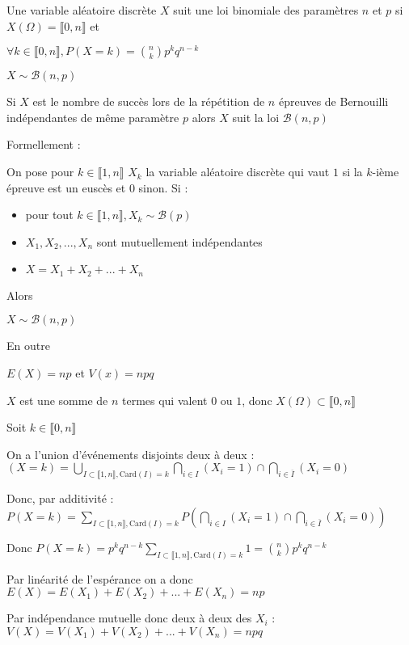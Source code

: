 \documentclass[a4paper,12pt]{book}
\newcommand{\Def}[2]{\begin{tcolorbox}[sharp corners, colback=white,colframe=blue!90!black!75, title=Définition : #1]#2\end{tcolorbox}}
\newcommand{\Prop}[2]{\begin{tcolorbox}[sharp corners, colback=white,colframe=red!90!black!75, title=Proposition : #1]#2\end{tcolorbox}}
\newcommand{\Pre}[1]{\begin{tcolorbox}[sharp corners, colback=white,colframe=green!60!green!30!black!75, title=Preuve]#1\end{tcolorbox}}
\begin{document}
\Def{}{Une variable aléatoire discrète $X$ suit une loi binomiale des paramètres $n$ et $p$ si $X(\Omega)=\llbracket 0,n\rrbracket$ et
\par\begin{center}$\forall k\in \llbracket 0,n\rrbracket, P(X=k)=\binom{n}{k}p^kq^{n-k}$\end{center}
\par $X\sim \mathcal{B}(n,p)$}
\Prop{Modèle loi binomiale}{Si $X$ est le nombre de succès lors de la répétition de $n$ épreuves de Bernouilli indépendantes de même paramètre $p$ alors $X$ suit la loi $\mathcal{B}(n,p)$
\par Formellement :
\par On pose pour $k\in\llbracket 1,n\rrbracket$ $X_k$ la variable aléatoire discrète qui vaut $1$ si la $k$-ième épreuve est un euscès et $0$ sinon. Si :\begin{itemize}
\item pour tout $k\in\llbracket 1,n\rrbracket, X_k\sim\mathcal{B}(p)$
\item $X_1,X_2,..., X_n$ sont mutuellement indépendantes
\item $X=X_1+X_2+...+X_n$
\end{itemize}
Alors \par\begin{center}$X\sim \mathcal{B}(n,p)$\end{center}
\par En outre \par\begin{center}$E(X)=np$ et $V(x)=npq$\end{center}}
\Pre{$X$ est une somme de $n$ termes qui valent $0$ ou $1$, donc $X(\Omega)\subset \llbracket 0,n\rrbracket$
\par Soit $k\in\llbracket 0,n\rrbracket$
\par On a l'union d'événements disjoints deux à deux : $(X=k) =\bigcup_{I\subset \llbracket 1,n\rrbracket, \mathrm{Card}(I)=k} \bigcap_{i\in I}(X_i=1)\cap \bigcap_{i\in\overline{I}}(X_i=0)$
\par Donc, par additivité : $P(X=k) = \sum\limits_{I\subset \llbracket 1,n\rrbracket, \mathrm{Card}(I)=k}P\left(\bigcap_{i\in I}(X_i=1)\cap \bigcap_{i\in\overline{I}}(X_i=0)\right)$
\par Donc $P(X=k)=p^kq^{n-k} \sum\limits_{I\subset \llbracket 1,n\rrbracket, \mathrm{Card}(I)=k}1 = \binom{n}{k}p^kq^{n-k}$
\par Par linéarité de l'espérance on a donc $E(X) = E(X_1)+E(X_2)+...+E(X_n) = np$
\par Par indépendance mutuelle donc deux à deux des $X_i$ : $V(X) = V(X_1)+V(X_2)+...+V(X_n)=npq$}
\end{document}
